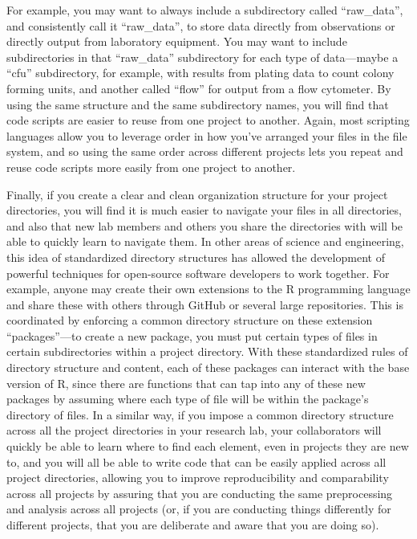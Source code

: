 \documentclass[]{tufte-book}
\begin{document}
For example, you may want to always include a subdirectory called ``raw\_data'', and
consistently call it ``raw\_data'', to store data directly from observations or
directly output from laboratory equipment. You may want to include subdirectories
in that ``raw\_data'' subdirectory for each type of data---maybe a ``cfu'' subdirectory,
for example, with results from plating data to count colony forming units, and
another called ``flow'' for output from a flow cytometer. By using the same structure
and the same subdirectory names, you will find that code scripts are easier to
reuse from one project to another. Again, most scripting languages allow you to
leverage order in how you've arranged your files in the file system, and so using
the same order across different projects lets you repeat and reuse code scripts
more easily from one project to another.

Finally, if you create a clear and clean organization structure for your project
directories, you will find it is much easier to navigate your files in all
directories, and also that new lab members and others you share the directories
with will be able to quickly learn to navigate them. In other areas of science
and engineering, this idea of standardized directory structures has allowed the
development of powerful techniques for open-source software developers to work
together. For example, anyone may create their own extensions to the R
programming language and share these with others through GitHub or several large
repositories. This is coordinated by enforcing a common directory structure on
these extension ``packages''---to create a new package, you must put certain types
of files in certain subdirectories within a project directory. With these
standardized rules of directory structure and content, each of these packages
can interact with the base version of R, since there are functions that can tap
into any of these new packages by assuming where each type of file will be
within the package's directory of files. In a similar way, if you impose a
common directory structure across all the project directories in your research
lab, your collaborators will quickly be able to learn where to find each
element, even in projects they are new to, and you will all be able to write
code that can be easily applied across all project directories, allowing you to
improve reproducibility and comparability across all projects by assuring that
you are conducting the same preprocessing and analysis across all projects (or,
if you are conducting things differently for different projects, that you are
deliberate and aware that you are doing so).
\end{document}
